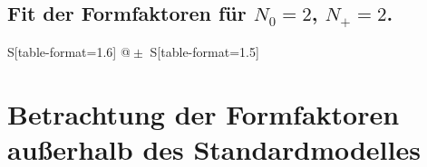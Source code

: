 \subsection{Fit der Formfaktoren für \texorpdfstring{$N_0 = \num{2}$, $N_+ = \num{2}$}{N0 = 2, N+ = 2}.}

\begin{table}
    \centering
    \caption{Messdaten Modenbestimmung.}
    \label{tab:moden}
    \begin{tabular}{
	S[table-format=1.6]
	@{${}\pm{}$}
	S[table-format=1.5]
	}
	\toprule
			\\
	\midrule
    
    \bottomrule
    \end{tabular}
    \end{table}


\section{Betrachtung der Formfaktoren außerhalb des Standardmodelles}
